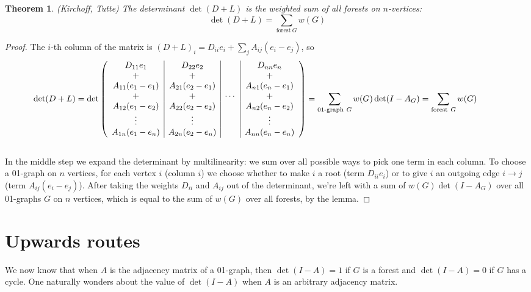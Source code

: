 \documentclass[a4paper, 11pt]{article}
\newtheorem{theorem}{Theorem}[section]
\theoremstyle{definition}
\begin{document}
\begin{theorem} (Kirchoff, Tutte) The determinant $\det(D + L)$ is the weighted sum of all forests on $n$-vertices:
  \[
    \det(D + L) = \sum_{\text{forest}\ G} w(G)
  \]
\end{theorem}
\begin{proof}
  The $i$-th column of the matrix is $(D + L)_i = D_{ii} e_i + \sum_j A_{ij}(e_i - e_j)$, so \bigskip
  \begin{align*}
    \hspace*{-1cm}
    \det(D + L) = \det \left(
    \begin{array}{c|c|c|c}
      D_{11} e_1         & D_{22} e_2         &        & D_{nn} e_n          \\
      +                  & +                  &        & +                   \\
      A_{11} (e_1 - e_1) & A_{21} (e_2 - e_1) &        & A_{n1} (e_n - e_1)  \\
      +                  & +                  & \cdots & +                   \\
      A_{12} (e_1 - e_2) & A_{22} (e_2 - e_2) &        & A_{n2} (e_n - e_2)  \\
      \vdots             & \vdots             &        & \vdots              \\
      A_{1n} (e_1 - e_n) & A_{2n} (e_2 - e_n) &        & A_{nn} (e_n - e_n)
    \end{array} \right)
    = \sum_{\text{01-graph}\ G} w(G) \det(I - A_G)
    = \sum_{\text{forest}\ G} w(G)
  \end{align*} \medskip \\
  In the middle step we expand the determinant by multilinearity: we sum over all possible ways to pick one term in each column. To choose a 01-graph on $n$ vertices, for each vertex $i$ (column $i$) we choose whether to make $i$ a root (term $D_{ii} e_i$) or to give $i$ an outgoing edge $i \to j$ (term $A_{ij}(e_i - e_j)$). After taking the weights $D_{ii}$ and $A_{ij}$ out of the determinant, we're left with a sum of $w(G) \det(I - A_G)$ over all 01-graphs $G$ on $n$ vertices, which is equal to the sum of $w(G)$ over all forests, by the lemma.
\end{proof}

\section{Upwards routes}

We now know that when $A$ is the adjacency matrix of a 01-graph, then $\det(I - A) = 1$ if $G$ is a forest and $\det(I - A) = 0$ if $G$ has a cycle. One naturally wonders about the value of $\det(I - A)$ when $A$ is an arbitrary adjacency matrix.
\end{document}
